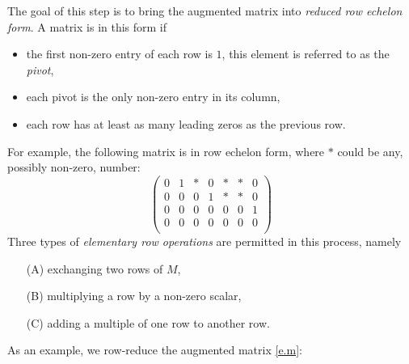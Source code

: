 The goal of this step is to bring the augmented matrix into
\emph{reduced row echelon form}.  A matrix is in this form if
\begin{itemize}
\item the first non-zero entry of each row is $1$, this element is
referred to as the \emph{pivot},
\item each pivot is the only non-zero entry in its column,
\item each row has at least as many leading zeros as the previous
row. 
\end{itemize}
For example, the following matrix is in row echelon form, where $*$
could be any, possibly non-zero, number:
\begin{equation*}
  \begin{pmatrix}
  0 & 1 & * & 0 & * & * & 0 \\
  0 & 0 & 0 & 1 & * & * & 0 \\
  0 & 0 & 0 & 0 & 0 & 0 & 1 \\
  0 & 0 & 0 & 0 & 0 & 0 & 0 \\
  \end{pmatrix}
\end{equation*}
Three types of \emph{elementary row operations} are permitted in this
process, namely
\begin{itemize}
\item[(A)] exchanging two rows of $M$,
\item[(B)] multiplying a row by a non-zero scalar,
\item[(C)] adding a multiple of one row to another row.
\end{itemize}
As an example, we row-reduce the augmented matrix \eqref{e.m}:
